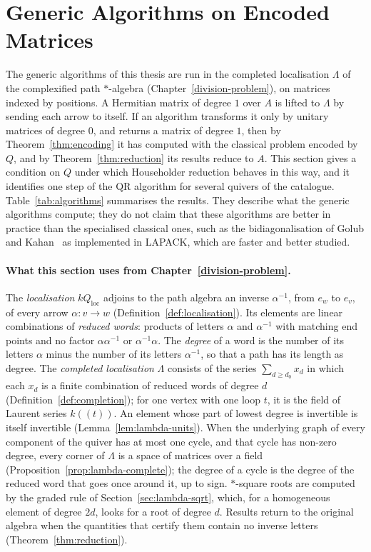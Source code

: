 \documentclass[12pt, a4paper]{report}
\theoremstyle{plain}
\theoremstyle{definition}
\theoremstyle{remark}
\theoremstyle{plain}
\begin{document}
\section{Generic Algorithms on Encoded Matrices}
\label{sec:encoded-algorithms}
The generic algorithms of this thesis are run in the completed localisation $\Lambda$ of the complexified path $*$-algebra (Chapter~\ref{division-problem}), on matrices indexed by positions. A Hermitian matrix of degree $1$ over $A$ is lifted to $\Lambda$ by sending each arrow to itself. If an algorithm transforms it only by unitary matrices of degree $0$, and returns a matrix of degree $1$, then by Theorem~\ref{thm:encoding} it has computed with the classical problem encoded by $Q$, and by Theorem~\ref{thm:reduction} its results reduce to $A$. This section gives a condition on $Q$ under which Householder reduction behaves in this way, and it identifies one step of the QR algorithm for several quivers of the catalogue. Table~\ref{tab:algorithms} summarises the results. They describe what the generic algorithms compute; they do not claim that these algorithms are better in practice than the specialised classical ones, such as the bidiagonalisation of Golub and Kahan~\cite{GolubKahan1965} as implemented in LAPACK, which are faster and better studied.

\paragraph{What this section uses from Chapter~\ref{division-problem}.} The \emph{localisation} $kQ_{\mathrm{loc}}$ adjoins to the path algebra an inverse $\alpha^{-1}$, from $e_w$ to $e_v$, of every arrow $\alpha:v\to w$ (Definition~\ref{def:localisation}). Its elements are linear combinations of \emph{reduced words}: products of letters $\alpha$ and $\alpha^{-1}$ with matching end points and no factor $\alpha\alpha^{-1}$ or $\alpha^{-1}\alpha$. The \emph{degree} of a word is the number of its letters $\alpha$ minus the number of its letters $\alpha^{-1}$, so that a path has its length as degree. The \emph{completed localisation} $\Lambda$ consists of the series $\sum_{d\geq d_0}x_d$ in which each $x_d$ is a finite combination of reduced words of degree $d$ (Definition~\ref{def:completion}); for one vertex with one loop $t$, it is the field of Laurent series $k((t))$. An element whose part of lowest degree is invertible is itself invertible (Lemma~\ref{lem:lambda-units}). When the underlying graph of every component of the quiver has at most one cycle, and that cycle has non-zero degree, every corner of $\Lambda$ is a space of matrices over a field (Proposition~\ref{prop:lambda-complete}); the degree of a cycle is the degree of the reduced word that goes once around it, up to sign. $*$-square roots are computed by the graded rule of Section~\ref{sec:lambda-sqrt}, which, for a homogeneous element of degree $2d$, looks for a root of degree $d$. Results return to the original algebra when the quantities that certify them contain no inverse letters (Theorem~\ref{thm:reduction}).
\end{document}
